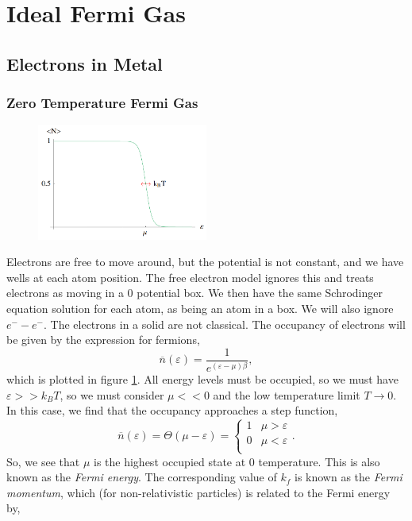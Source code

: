 \documentclass{book}
\begin{document}
\section{Ideal Fermi Gas}
\subsection{Electrons in Metal}
\subsubsection{Zero Temperature Fermi Gas}
\begin{figure}[h]
	\centering
	\includegraphics[width=0.5\textwidth]{fermion.png}
	\caption{}
	\label{eq:fermion}
\end{figure}
Electrons are free to move around, but the potential is not constant, and we have wells at each atom position. The free electron model ignores this and treats electrons as moving in a 0 potential box. We then have the same Schrodinger equation solution for each atom, as being an atom in a box. We will also ignore $e^- - e^-$. The electrons in a solid are not classical. The occupancy of electrons will be given by the expression for fermions,
\begin{equation}
	\overline{n}(\varepsilon)  = \frac{1}{e^{(\varepsilon - \mu)\beta}},
\end{equation}
which is plotted in figure \ref{eq:fermion}. All energy levels must be occupied, so we must have $\varepsilon >> k_BT$, so we must consider $\mu << 0$ and the low temperature limit $T \to 0$. In this case, we find that the occupancy approaches a step function,
\begin{equation}
	\overline{n}(\varepsilon) = \Theta(\mu - \varepsilon) = \begin{cases}
		1 & \mu > \varepsilon \\
		0 & \mu < \varepsilon \\
	\end{cases}.
\end{equation}
So, we see that $\mu$ is the highest occupied state at 0 temperature. This is also known as the \textit{Fermi energy}. The corresponding value of $k_f$ is known as the \textit{Fermi momentum}, which (for non-relativistic particles) is related to the Fermi energy by,
\end{document}
